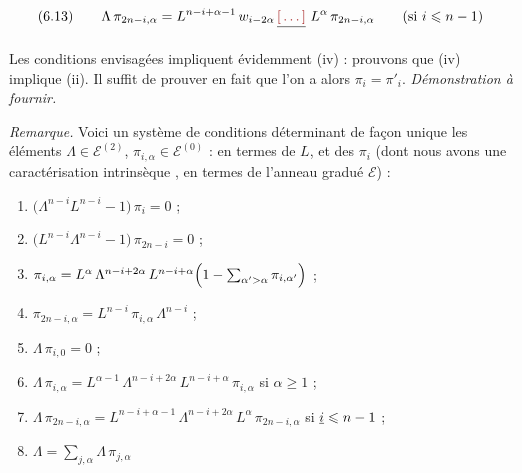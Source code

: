 \documentclass[11pt,a4paper]{article}
\begin{document}


\[ (6.13) \qquad \Lambda\, \pi_{2n-i,\alpha} = L^{n-i+\alpha-1}\, w_{i-2\alpha}\, \struck{\ill{}}\ L^{\alpha}\, \pi_{2n-i,\alpha} \qquad (\text{si } i \leqslant n-1) \]

Les conditions envisagées impliquent évidemment (iv) : prouvons que
(iv) implique (ii). Il suffit de prouver en fait que l'on a alors
$\pi_{i} = \pi'_{i}$.
\emph{Démonstration à fournir.}

\emph{Remarque.} Voici un système de conditions déterminant de façon unique
les éléments $\Lambda \in \mathcal{E}^{(2)}$,
$\pi_{i,\alpha} \in \mathcal{E}^{(0)}$ : en termes de $L$, et des $\pi_{i}$
(dont nous avons  une caractérisation intrinsèque
, en termes de l'anneau gradué $\mathcal{E}$) :


\begin{enumerate}
  \item $\bigl( \Lambda^{n-i} L^{n-i} - 1 \bigr)\, \pi_{i} = 0$ ;
  \item $\bigl( L^{n-i} \Lambda^{n-i} - 1 \bigr)\, \pi_{2n-i} = 0$ ;
  \item $\pi_{i,\alpha} = L^{\alpha}\, \Lambda^{n-i+2\alpha}\, L^{n-i+\alpha} \Bigl( 1 - \sum_{\alpha' > \alpha} \pi_{i,\alpha'} \Bigr)$ ;
  \item $\pi_{2n-i,\alpha} = L^{n-i}\, \pi_{i,\alpha}\, \Lambda^{n-i}$ ;
  \item $\Lambda\, \pi_{i,0} = 0$ ;
  \item $\Lambda\, \pi_{i,\alpha} = L^{\alpha-1}\, \Lambda^{n-i+2\alpha}\, L^{n-i+\alpha}\, \pi_{i,\alpha}$ si $\alpha \geqslant 1$ ;
  \item $\Lambda\, \pi_{2n-i,\alpha} = L^{n-i+\alpha-1}\, \Lambda^{n-i+2\alpha}\, L^{\alpha}\, \pi_{2n-i,\alpha}$ si $\uncertain{i} \leqslant n-1$ ;
  \item $\Lambda = \sum_{j,\alpha} \Lambda\, \pi_{j,\alpha}$
\end{enumerate}
\end{document}

